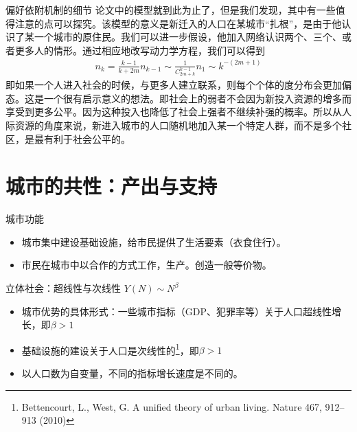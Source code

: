 \documentclass[utf8]{ctexbeamer}
\begin{document}
\begin{frame}{偏好依附机制的细节}
    论文中的模型就到此为止了，但是我们发现，其中有一些值得注意的点可以探究。该模型的意义是新迁入的人口在某城市“扎根”，是由于他认识了某一个城市的原住民。我们可以进一步假设，他加入网络认识两个、三个、或者更多人的情形。通过相应地改写动力学方程，我们可以得到\begin{align}
        n_k = \frac{k-1}{k+2m}n_{k-1}\sim\frac{1}{C_{2m+k}^{k-1}}n_1\sim k^{-(2m+1)} \label{degm}
    \end{align}即如果一个人进入社会的时候，与更多人建立联系，则每个个体的度分布会更加偏态。这是一个很有启示意义的想法。即社会上的弱者不会因为新投入资源的增多而享受到更多公平。因为这种投入也降低了社会上强者不继续补强的概率。所以从人际资源的角度来说，新进入城市的人口随机地加入某一个特定人群，而不是多个社区，是最有利于社会公平的。
\end{frame}



\section{城市的共性：产出与支持}



\begin{frame}{城市功能}
\begin{itemize}
    \item 城市集中建设基础设施，给市民提供了生活要素（衣食住行）。
    \item 市民在城市中以合作的方式工作，生产。创造一般等价物。
\end{itemize}
\end{frame}

\begin{frame}{立体社会：超线性与次线性}
    \(Y(N)\sim N^\beta \)
    \vspace{0.5cm}
    \begin{itemize}
        \item 城市优势的具体形式：一些城市指标（GDP、犯罪率等）关于人口超线性增长，即\(\beta>1\)
        \item 基础设施的建设关于人口是次线性的\footnote{Bettencourt, L., West, G. A unified theory of urban living. Nature 467, 912–913 (2010)}，即\(\beta>1\)
        \vspace{0.5cm}
        \item 以人口数为自变量，不同的指标增长速度是不同的。
    \end{itemize}
\end{frame}
\end{document}
